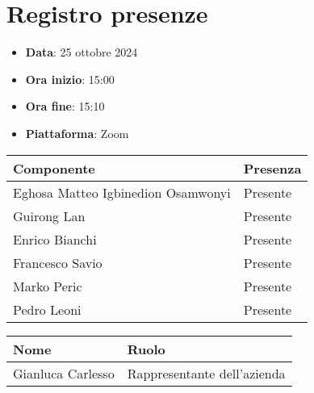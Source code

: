 \documentclass[a4paper, 12pt]{article}
\begin{document}
\section{Registro presenze}
\begin{itemize}
    \item[] \textbf{Data}: 25 ottobre 2024
    \item[] \textbf{Ora inizio}:  15:00
    \item[] \textbf{Ora fine}: 15:10
    \item[] \textbf{Piattaforma}: Zoom	
\end{itemize}
\begin{table}[!h]
\centering
{\renewcommand{\arraystretch}{2}
\begin{tabularx}{\textwidth}{| X | X |}
    \hline
        \textbf{\large Componente} & 
        \textbf{\large Presenza} \\ 
    \hline 
    \hline
        Eghosa Matteo Igbinedion Osamwonyi&
        Presente \\
    \hline 
        Guirong Lan&
        Presente \\
    \hline 
        Enrico Bianchi&
        Presente \\
    \hline 
        Francesco Savio&
        Presente \\
    \hline 
        Marko Peric&
        Presente \\
    \hline 
        Pedro Leoni&
        Presente \\
    \hline 

\end{tabularx}}
\end{table}

\begin{table}[!h]
    \centering
    {\renewcommand{\arraystretch}{2}
    \begin{tabularx}{\textwidth}{| X | X |}
        \hline
            \textbf{\large Nome} & 
            \textbf{\large Ruolo} \\ 
        \hline 
        \hline
            Gianluca Carlesso&
            Rappresentante dell'azienda \\
        \hline 

    \end{tabularx}}
\end{table}

\newpage
\end{document}
